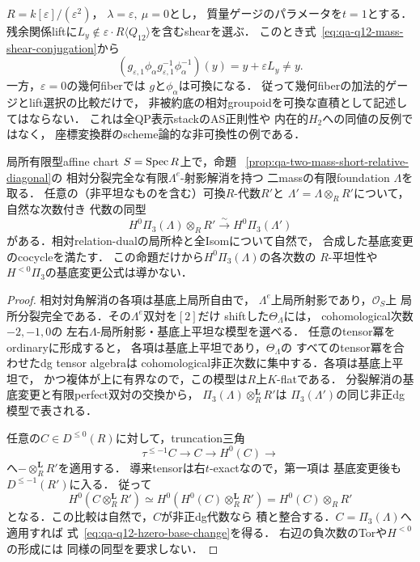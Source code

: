 \begin{example}[双対数上では二作用は可換でない]
\label{ex:qa-q12-mass-shear-first-order-commutator}
$R=k[\varepsilon]/(\varepsilon^2)$，
$\lambda=\varepsilon,\ \mu=0$とし，
質量ゲージのパラメータを$t=1$とする．
残余関係liftに$L_y\notin\varepsilon\cdot
R\langle Q_{12}\rangle$を含むshearを選ぶ．
このとき式~\eqref{eq:qa-q12-mass-shear-conjugation}から
\[
 (g_{\varepsilon,1}\phi_\alpha
   g_{\varepsilon,1}^{-1}\phi_\alpha^{-1})(y)
    =y+\varepsilon L_y\ne y .
\]
一方，$\varepsilon=0$の幾何fiberでは
$g$と$\phi_\alpha$は可換になる．
従って幾何fiberの加法的ゲージとlift選択の比較だけで，
非被約底の相対groupoidを可換な直積として記述してはならない．
これは全QP表示stackのAS正則性や
内在的$H_2$への同値の反例ではなく，
座標変換群のscheme論的な非可換性の例である．
\end{example}

\begin{lemma}
\label{lem:qa-q12-hzero-nonflat-base-change}
局所有限型affine chart $S=\operatorname{Spec} R$上で，命題~
\ref{prop:qa-two-mass-short-relative-diagonal}の
相対分裂完全な有限$\Lambda^e$-射影解消を持つ
二massの有限foundation $\Lambda$を取る．
任意の（非平坦なものを含む）可換$R$-代数$R'$と
$\Lambda'=\Lambda\otimes_RR'$について，自然な次数付き
代数の同型
\[
 H^0\Pi_3(\Lambda)\otimes_RR'
 \xrightarrow{\ \sim\ } H^0\Pi_3(\Lambda')
 \tag{BC0}\label{eq:qa-q12-hzero-base-change}
\]
がある．相対relation-dualの局所枠と全Isomについて自然で，
合成した基底変更のcocycleを満たす．
この命題だけから$H^0\Pi_3(\Lambda)$の各次数の
$R$-平坦性や$H^{<0}\Pi_3$の基底変更公式は導かない．
\end{lemma}
\begin{proof}
相対対角解消の各項は基底上局所自由で，
$\Lambda^e$上局所射影であり，$\mathcal O_S$上
局所分裂完全である．その$\Lambda^e$双対を$[2]$だけ
shiftした$\Theta_\Lambda$には，
cohomological次数$-2,-1,0$の
左右$\Lambda$-局所射影・基底上平坦な模型を選べる．
任意のtensor冪をordinaryに形成すると，
各項は基底上平坦であり，$\Theta_\Lambda$の
すべてのtensor冪を合わせたdg tensor algebraは
cohomological非正次数に集中する．各項は基底上平坦で，
かつ複体が上に有界なので，この模型は$R$上$K$-flatである．
分裂解消の基底変更と有限perfect双対の交換から，
$\Pi_3(\Lambda)\otimes_R^{\mathbf L}R'$は
$\Pi_3(\Lambda')$の同じ非正dg模型で表される．

任意の$C\in D^{\leq0}(R)$に対して，truncation三角
\[
 \tau^{\leq-1}C\longrightarrow C
 \longrightarrow H^0(C)\longrightarrow
\]
へ$-\otimes_R^{\mathbf L}R'$を適用する．
導来tensorは右$t$-exactなので，第一項は
基底変更後も$D^{\leq-1}(R')$に入る．
従って
\[
 H^0(C\otimes_R^{\mathbf L}R')
  \simeq H^0(H^0(C)\otimes_R^{\mathbf L}R')
  =H^0(C)\otimes_RR'
\]
となる．この比較は自然で，$C$が非正dg代数なら
積と整合する．$C=\Pi_3(\Lambda)$へ適用すれば
式~\eqref{eq:qa-q12-hzero-base-change}を得る．
右辺の負次数のTorや$H^{<0}$の形成には
同様の同型を要求しない．
\end{proof}

